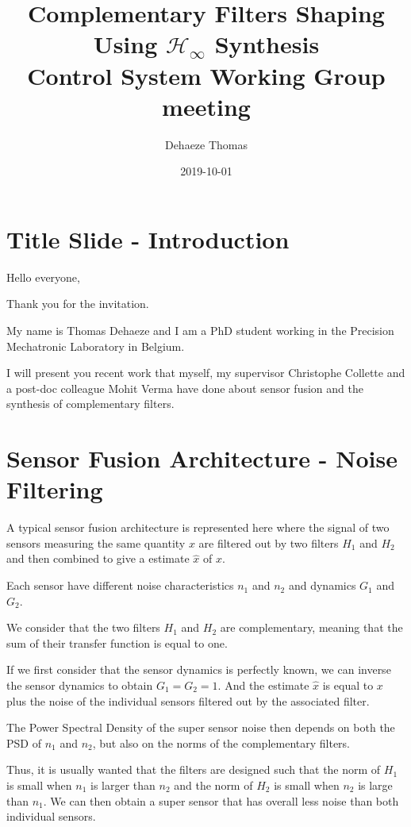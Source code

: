 \documentclass[hangsection=false, titlepage=false, tocnp=false]{cleanreport}
\author{Dehaeze Thomas}
\date{2019-10-01}
\title{Complementary Filters Shaping Using \(\mathcal{H}_\infty\) Synthesis\\\medskip
\large Control System Working Group meeting}
\begin{document}
\maketitle

\section{Title Slide - Introduction}
\label{sec:orgda5d0ad}
Hello everyone,

Thank you for the invitation.

My name is Thomas Dehaeze and I am a PhD student working in the Precision Mechatronic Laboratory in Belgium.

I will present you recent work that myself, my supervisor Christophe Collette and a post-doc colleague Mohit Verma have done about sensor fusion and the synthesis of complementary filters.

\section{Sensor Fusion Architecture - Noise Filtering}
\label{sec:org498fb95}
A typical sensor fusion architecture is represented here where the signal of two sensors measuring the same quantity \(x\) are filtered out by two filters \(H_1\) and \(H_2\) and then combined to give a estimate \(\hat{x}\) of \(x\).

Each sensor have different noise characteristics \(n_1\) and \(n_2\) and dynamics \(G_1\) and \(G_2\).

We consider that the two filters \(H_1\) and \(H_2\) are complementary, meaning that the sum of their transfer function is equal to one.

If we first consider that the sensor dynamics is perfectly known, we can inverse the sensor dynamics to obtain \(G_1 = G_2 = 1\). And the estimate \(\hat{x}\) is equal to \(x\) plus the noise of the individual sensors filtered out by the associated filter.

The Power Spectral Density of the super sensor noise then depends on both the PSD of \(n_1\) and \(n_2\), but also on the norms of the complementary filters.

Thus, it is usually wanted that the filters are designed such that the norm of \(H_1\) is small when \(n_1\) is larger than \(n_2\) and the norm of \(H_2\) is small when \(n_2\) is large than \(n_1\). We can then obtain a super sensor that has overall less noise than both individual sensors.
\end{document}
